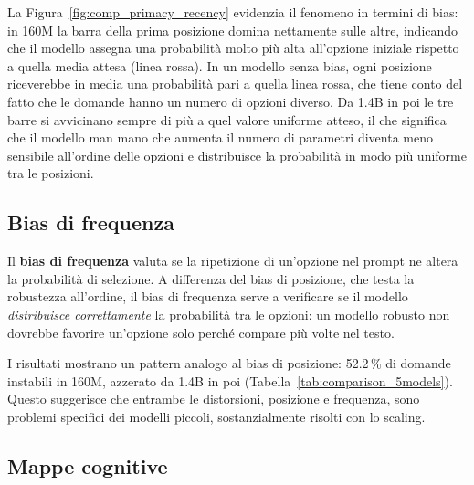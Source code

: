 \documentclass[../relazione.tex]{subfiles}
\begin{document}
La Figura~\ref{fig:comp_primacy_recency} evidenzia il fenomeno in termini di bias: in 160M la barra della prima posizione domina nettamente sulle altre, indicando che il modello assegna una probabilità molto più alta all'opzione iniziale rispetto a quella media attesa (linea rossa). In un modello senza bias, ogni posizione riceverebbe in media una probabilità pari a quella linea rossa, che tiene conto del fatto che le domande hanno un numero di opzioni diverso. Da 1.4B in poi le tre barre si avvicinano sempre di più a quel valore uniforme atteso, il che significa che il modello man mano che aumenta il numero di parametri diventa meno sensibile all'ordine delle opzioni e distribuisce la probabilità in modo più uniforme tra le posizioni.

\subsection{Bias di frequenza}

Il \textbf{bias di frequenza} valuta se la ripetizione di un'opzione nel prompt ne altera la probabilità di selezione. A differenza del bias di posizione, che testa la robustezza all'ordine, il bias di frequenza serve a verificare se il modello \emph{distribuisce correttamente} la probabilità tra le opzioni: un modello robusto non dovrebbe favorire un'opzione solo perché compare più volte nel testo.

I risultati mostrano un pattern analogo al bias di posizione: 52.2\,\% di domande instabili in 160M, azzerato da 1.4B in poi (Tabella~\ref{tab:comparison_5models}). Questo suggerisce che entrambe le distorsioni, posizione e frequenza, sono problemi specifici dei modelli piccoli, sostanzialmente risolti con lo scaling.

\subsection{Mappe cognitive}
\end{document}
